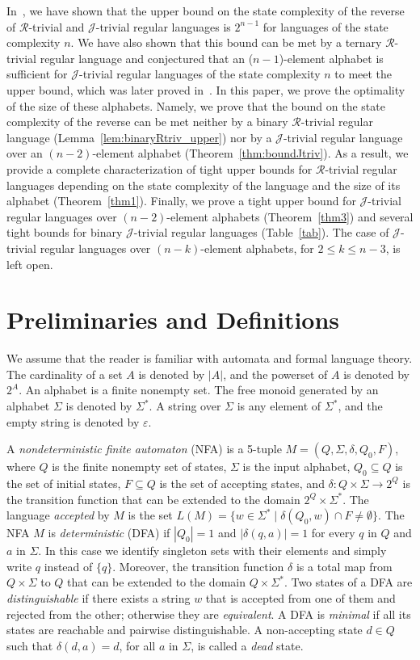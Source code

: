 \documentclass[runningheads]{llncs}
\newcommand{\eps}{\varepsilon}
\newcommand{\R}{$\mathcal{R}$}
\newcommand{\J}{$\mathcal{J}$}
\begin{document}
  In~\cite{ciaa2012}, we have shown that the upper bound on the state complexity of the reverse of \R-trivial and \J-trivial regular languages is $2^{n-1}$ for languages of the state complexity $n$. We have also shown that this bound can be met by a ternary \R-trivial regular language and conjectured that an ($n-1$)-element alphabet is sufficient for \J-trivial regular languages of the state complexity $n$ to meet the upper bound, which was later proved in~\cite{BrArXiv12}. In this paper, we prove the optimality of the size of these alphabets. Namely, we prove that the bound on the state complexity of the reverse can be met neither by a binary \R-trivial regular language (Lemma~\ref{lem:binaryRtriv_upper}) nor by a \J-trivial regular language over an $(n-2)$-element alphabet (Theorem~\ref{thm:boundJtriv}). As a result, we provide a complete characterization of tight upper bounds for \R-trivial regular languages depending on the state complexity of the language and the size of its alphabet (Theorem~\ref{thm1}). Finally, we prove a tight upper bound for \J-trivial regular languages over $(n-2)$-element alphabets (Theorem~\ref{thm3}) and several tight bounds for binary \J-trivial regular languages (Table~\ref{tab}). The case of \J-trivial regular languages over $(n-k)$-element alphabets, for $2\le k\le n-3$, is left open.
  

\section{Preliminaries and Definitions}
  We assume that the reader is familiar with automata and formal language theory. The cardinality of a set $A$ is denoted by $|A|$, and the powerset of $A$ is denoted by $2^A$. An alphabet is a finite nonempty set. The free monoid generated by an alphabet $\Sigma$ is denoted by $\Sigma^*$. A string over $\Sigma$ is any element of $\Sigma^*$, and the empty string is denoted by $\eps$.

  A {\em nondeterministic finite automaton\/} (NFA) is a 5-tuple $M = (Q,\Sigma,\delta,Q_0,F)$, where $Q$ is the finite nonempty set of states, $\Sigma$ is the input alphabet, $Q_0\subseteq Q$ is the set of initial states, $F\subseteq Q$ is the set of accepting states, and $\delta:Q\times\Sigma\to 2^Q$ is the transition function that can be extended to the domain $2^Q\times\Sigma^*$. The language {\em accepted\/} by $M$ is the set $L(M) = \{w\in\Sigma^* \mid \delta(Q_0, w) \cap F \neq\emptyset\}$. The NFA $M$ is {\em deterministic\/} (DFA) if $|Q_0|=1$ and $|\delta(q,a)|=1$ for every $q$ in $Q$ and $a$ in $\Sigma$. In this case we identify singleton sets with their elements and simply write $q$ instead of $\{q\}$. Moreover, the transition function $\delta$ is a total map from $Q\times\Sigma$ to $Q$ that can be extended to the domain $Q\times\Sigma^*$. Two states of a DFA are {\em distinguishable\/} if there exists a string $w$ that is accepted from one of them and rejected from the other; otherwise they are {\em equivalent}. A DFA is {\em minimal\/} if all its states are reachable and pairwise distinguishable. A non-accepting state $d\in Q$ such that $\delta(d,a)=d$, for all $a$ in $\Sigma$, is called a {\em dead\/} state.
  
\end{document}
